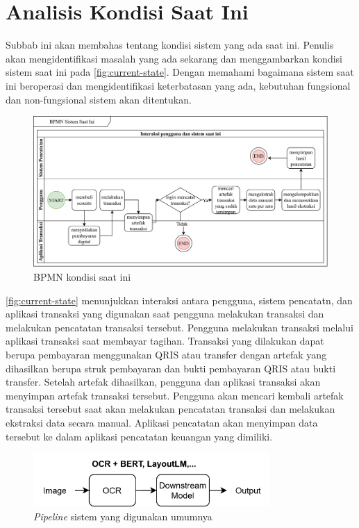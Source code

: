 \section{Analisis Kondisi Saat Ini}
\label{sec:analisis-kondisi-saat-ini}

Subbab ini akan membahas tentang kondisi sistem yang ada saat ini. Penulis akan mengidentifikasi masalah yang ada sekarang dan menggambarkan kondisi sistem saat ini pada \autoref{fig:current-state}. Dengan memahami bagaimana sistem saat ini beroperasi dan mengidentifikasi keterbatasan yang ada, kebutuhan fungsional dan non-fungsional sistem akan ditentukan.

\begin{figure}[htbp]
    \centering
    \includegraphics[width=.925\textwidth]{images/current-state.png}
    \caption{BPMN kondisi saat ini}
    \label{fig:current-state}
\end{figure}

\autoref{fig:current-state} menunjukkan interaksi antara pengguna, sistem pencatatn, dan aplikasi transaksi yang digunakan saat pengguna melakukan transaksi dan melakukan pencatatan transaksi tersebut. Pengguna melakukan transaksi melalui aplikasi transaksi saat membayar tagihan. Transaksi yang dilakukan dapat berupa pembayaran menggunakan QRIS atau transfer dengan artefak yang dihasilkan berupa struk pembayaran dan bukti pembayaran QRIS atau bukti transfer. Setelah artefak dihasilkan, pengguna dan aplikasi transaksi akan menyimpan artefak transaksi tersebut. Pengguna akan mencari kembali artefak transaksi tersebut saat akan melakukan pencatatan transaksi dan melakukan ekstraksi data secara manual. Aplikasi pencatatan akan menyimpan data tersebut ke dalam aplikasi pencatatan keuangan yang dimiliki.

\begin{figure}[htbp]
    \centering
    \includegraphics[width=0.8\textwidth]{images/non-donut-pipeline.png}
    \caption{\emph{Pipeline} sistem yang digunakan umumnya}
    \label{fig:non-donut-pipeline}
\end{figure}

